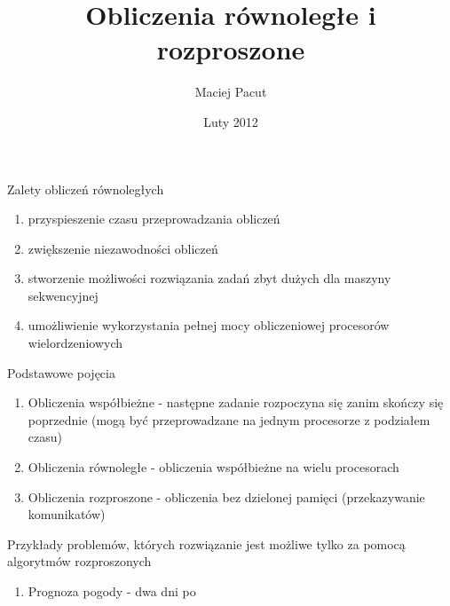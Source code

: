 \documentclass{beamer}
\title{Obliczenia równoległe i rozproszone}
\author{Maciej Pacut}
\date{Luty 2012}
\begin{document}
\maketitle

\begin{frame}{Zalety obliczeń równoległych}
  \begin{enumerate}
    \item przyspieszenie czasu przeprowadzania obliczeń
    \item \pause zwiększenie niezawodności obliczeń
    \item \pause stworzenie możliwości rozwiązania zadań zbyt dużych dla maszyny sekwencyjnej
    \item \pause umożliwienie wykorzystania pełnej mocy obliczeniowej procesorów wielordzeniowych
  \end{enumerate}
\end{frame}

\begin{frame}{Podstawowe pojęcia}
  \begin{enumerate}
    \item Obliczenia współbieżne - następne zadanie rozpoczyna się zanim skończy się poprzednie (mogą być przeprowadzane na jednym procesorze z podziałem czasu)
    \item Obliczenia równoległe - obliczenia współbieżne na wielu procesorach
    \item Obliczenia rozproszone - obliczenia bez dzielonej pamięci (przekazywanie komunikatów)
  \end{enumerate}
\end{frame}

\begin{frame}{Przykłady problemów, których rozwiązanie jest możliwe tylko za pomocą algorytmów rozproszonych}
  \begin{enumerate}
    \item Prognoza pogody - dwa dni po
  \end{enumerate}
\end{frame}
\end{document}

